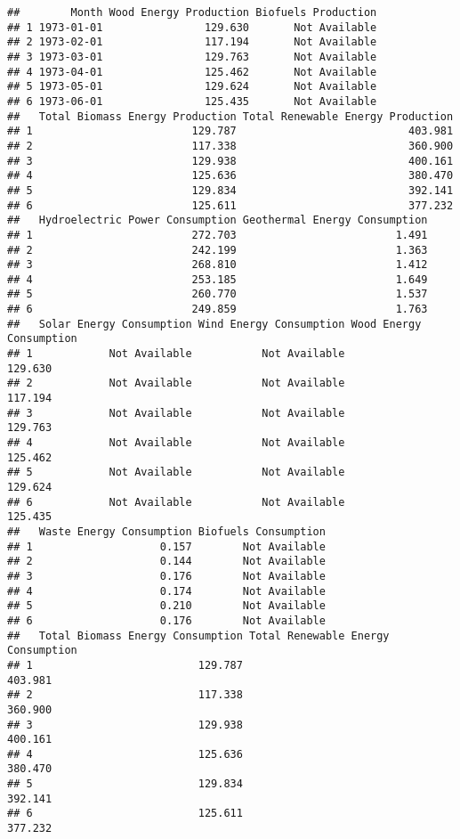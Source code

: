 \documentclass[
]{article}
\begin{document}
\begin{verbatim}
##        Month Wood Energy Production Biofuels Production
## 1 1973-01-01                129.630       Not Available
## 2 1973-02-01                117.194       Not Available
## 3 1973-03-01                129.763       Not Available
## 4 1973-04-01                125.462       Not Available
## 5 1973-05-01                129.624       Not Available
## 6 1973-06-01                125.435       Not Available
##   Total Biomass Energy Production Total Renewable Energy Production
## 1                         129.787                           403.981
## 2                         117.338                           360.900
## 3                         129.938                           400.161
## 4                         125.636                           380.470
## 5                         129.834                           392.141
## 6                         125.611                           377.232
##   Hydroelectric Power Consumption Geothermal Energy Consumption
## 1                         272.703                         1.491
## 2                         242.199                         1.363
## 3                         268.810                         1.412
## 4                         253.185                         1.649
## 5                         260.770                         1.537
## 6                         249.859                         1.763
##   Solar Energy Consumption Wind Energy Consumption Wood Energy Consumption
## 1            Not Available           Not Available                 129.630
## 2            Not Available           Not Available                 117.194
## 3            Not Available           Not Available                 129.763
## 4            Not Available           Not Available                 125.462
## 5            Not Available           Not Available                 129.624
## 6            Not Available           Not Available                 125.435
##   Waste Energy Consumption Biofuels Consumption
## 1                    0.157        Not Available
## 2                    0.144        Not Available
## 3                    0.176        Not Available
## 4                    0.174        Not Available
## 5                    0.210        Not Available
## 6                    0.176        Not Available
##   Total Biomass Energy Consumption Total Renewable Energy Consumption
## 1                          129.787                            403.981
## 2                          117.338                            360.900
## 3                          129.938                            400.161
## 4                          125.636                            380.470
## 5                          129.834                            392.141
## 6                          125.611                            377.232
\end{verbatim}
\end{document}
